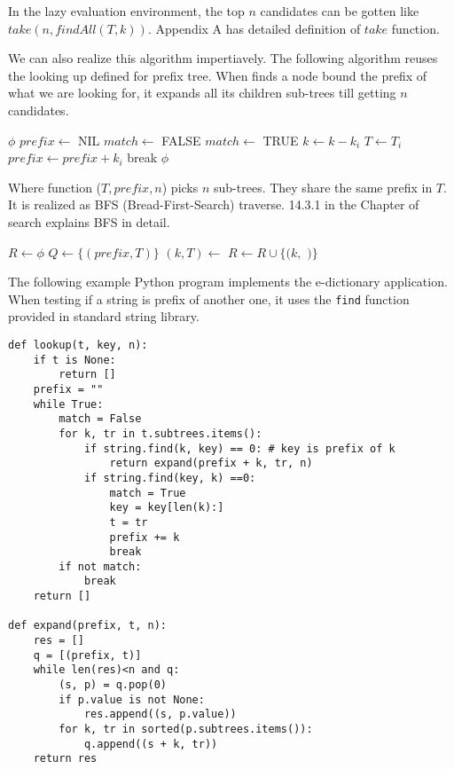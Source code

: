 \documentclass[b5paper]{article}
\begin{document}
In the lazy evaluation environment, the top $n$ candidates can be
gotten like $take(n, findAll(T, k))$. Appendix A has detailed definition
of $take$ function.

We can also realize this algorithm impertiavely.
The following algorithm reuses the looking up defined for prefix tree. When
finds a node bound the prefix of what we are looking for,
it expands all its children sub-trees till getting $n$ candidates.

\begin{algorithmic}[1]
     \State \Return $\phi$
  \EndIf
  \State $prefix \gets$ NIL
  \Repeat
    \State $match \gets$ FALSE
        \State \Return {}
      \EndIf
        \State $match \gets$ TRUE
        \State $k \gets k - k_i$
        \State $T \gets T_i$
        \State $prefix \gets prefix + k_i$
        \State break
      \EndIf
    \EndFor
  \State \Return $\phi$
\EndFunction
\end{algorithmic}

Where function ($T, prefix, n$) picks $n$ sub-trees. They
share the same prefix in $T$. It is realized as BFS (Bread-First-Search) traverse. 14.3.1 in the Chapter of search explains BFS in detail.

\begin{algorithmic}[1]
  \State $R \gets \phi$
  \State $Q \gets \{(prefix, T)\}$
    \State $(k, T) \gets$ 
      \State $R \gets R \cup \{(k, $  $)\}$
    \EndIf
      \State {}
    \EndFor
  \EndWhile
\EndFunction
\end{algorithmic}

The following example Python program implements the e-dictionary application.
When testing if a string is prefix of another one, it uses the \texttt{find}
function provided in standard string library.

\lstset{language=Python}
\begin{lstlisting}
def lookup(t, key, n):
    if t is None:
        return []
    prefix = ""
    while True:
        match = False
        for k, tr in t.subtrees.items():
            if string.find(k, key) == 0: # key is prefix of k
                return expand(prefix + k, tr, n)
            if string.find(key, k) ==0:
                match = True
                key = key[len(k):]
                t = tr
                prefix += k
                break
        if not match:
            break
    return []

def expand(prefix, t, n):
    res = []
    q = [(prefix, t)]
    while len(res)<n and q:
        (s, p) = q.pop(0)
        if p.value is not None:
            res.append((s, p.value))
        for k, tr in sorted(p.subtrees.items()):
            q.append((s + k, tr))
    return res
\end{lstlisting}
\end{document}
